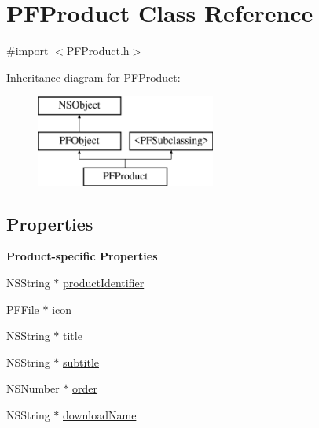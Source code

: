 \hypertarget{interface_p_f_product}{}\section{P\+F\+Product Class Reference}
\label{interface_p_f_product}


{\ttfamily \#import $<$P\+F\+Product.\+h$>$}

Inheritance diagram for P\+F\+Product\+:\begin{figure}[H]
\begin{center}
\leavevmode
\includegraphics[height=3.000000cm]{interface_p_f_product}
\end{center}
\end{figure}
\subsection*{Properties}
\begin{Indent}{\bf Product-\/specific Properties}\par
{\em 

 

 }\begin{DoxyCompactItemize}
\item 
N\+S\+String $\ast$ \hyperlink{interface_p_f_product_a354f59da62a2d695096b10f36e75a084}{product\+Identifier}
\item 
\hyperlink{interface_p_f_file}{P\+F\+File} $\ast$ \hyperlink{interface_p_f_product_a23132bc0aeaa67fa7d7e49b477818477}{icon}
\item 
N\+S\+String $\ast$ \hyperlink{interface_p_f_product_aca711bfd74798b7d0563d5ff5719c6d9}{title}
\item 
N\+S\+String $\ast$ \hyperlink{interface_p_f_product_a83e9bd4db5d395daf5d7d61094d0293d}{subtitle}
\item 
N\+S\+Number $\ast$ \hyperlink{interface_p_f_product_a8e78e9f4607e77954c425698ec7a151f}{order}
\item 
N\+S\+String $\ast$ \hyperlink{interface_p_f_product_a1462cf0bd4dffe98775e3439208ec238}{download\+Name}
\end{DoxyCompactItemize}
\end{Indent}
